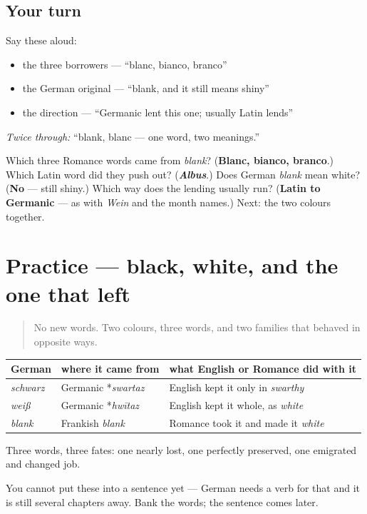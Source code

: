 \subsection*{Your turn}
Say these aloud:

\begin{itemize}
\raggedright
  \item the three borrowers — \textquotedblleft{}blanc, bianco, branco\textquotedblright{}
  \item the German original — \textquotedblleft{}blank, and it still means shiny\textquotedblright{}
  \item the direction — \textquotedblleft{}Germanic lent this one; usually Latin lends\textquotedblright{}
\end{itemize}

\emph{Twice through:} \textquotedblleft{}blank, blanc — one word, two meanings.\textquotedblright{}

\begin{tcolorbox}[breakable,colback=teal!4,colframe=teal!35!black,title={Before you move on}]
Which three Romance words came from \emph{blank}? (\textbf{Blanc, bianco, branco}.) Which Latin word did they push out? (\emph{\textbf{Albus}}.) Does German \emph{blank} mean white? (\textbf{No} — still shiny.) Which way does the lending usually run? (\textbf{Latin to Germanic} — as with \emph{Wein} and the month names.) Next: the two colours together.
\end{tcolorbox}
\section[Practice]{Practice — black, white, and the one that left}

\label{lesson:GE-C13-schwarz-weiss}



\begin{quote}
No new words. Two colours, three words, and two families that behaved in opposite ways.
\end{quote}

\begin{cousinweb}
\noindent
\begin{tabularx}{\linewidth}{@{}>{\raggedright\arraybackslash}X>{\raggedright\arraybackslash}X>{\raggedright\arraybackslash}X@{}}
\toprule
\textbf{German} & \textbf{where it came from} & \textbf{what English or Romance did with it} \\
\midrule
\emph{schwarz} & Germanic *\emph{swartaz} & English kept it only in \emph{swarthy} \\
\emph{weiß} & Germanic *\emph{hwītaz} & English kept it whole, as \emph{white} \\
\emph{blank} & Frankish \emph{blank} & Romance took it and made it \emph{white} \\
\bottomrule
\end{tabularx}

Three words, three fates: one nearly lost, one perfectly preserved, one emigrated and changed job.

You cannot put these into a sentence yet — German needs a verb for that and it is still several chapters away. Bank the words; the sentence comes later.
\end{cousinweb}

